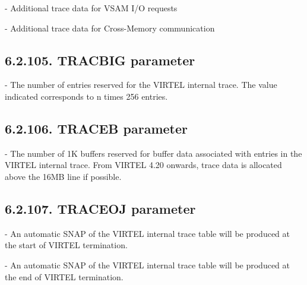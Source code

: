 \documentclass[letterpaper,10pt,english]{sphinxmanual}
\begin{document}
 - Additional trace data for VSAM I/O requests

 - Additional trace data for Cross-Memory communication


\subsection{6.2.105. TRACBIG parameter}
\label{\detokenize{Installation_Guide:tracbig-parameter}}
\begin{sphinxVerbatim}[commandchars=\\\{\}]
 
\end{sphinxVerbatim}

 - The number of entries reserved for the VIRTEL internal trace. The value indicated corresponds to n times 256 entries.


\subsection{6.2.106. TRACEB parameter}
\label{\detokenize{Installation_Guide:traceb-parameter}}
\begin{sphinxVerbatim}[commandchars=\\\{\}]
 
\end{sphinxVerbatim}

 - The number of 1K buffers reserved for buffer data associated with entries in the VIRTEL internal trace. From VIRTEL 4.20 onwards, trace data is allocated above the 16MB line if possible.


\subsection{6.2.107. TRACEOJ parameter}
\label{\detokenize{Installation_Guide:traceoj-parameter}}
\begin{sphinxVerbatim}[commandchars=\\\{\}]
 
\end{sphinxVerbatim}

 - An automatic SNAP of the VIRTEL internal trace table will be produced at the start of VIRTEL termination.

 - An automatic SNAP of the VIRTEL internal trace table will be produced at the end of VIRTEL termination.
\end{document}
